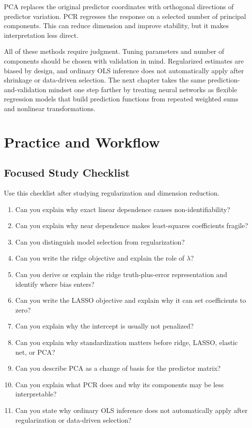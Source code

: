PCA replaces the original predictor coordinates with orthogonal directions of predictor variation.  PCR regresses the response on a selected number of principal components.  This can reduce dimension and improve stability, but it makes interpretation less direct.

All of these methods require judgment.  Tuning parameters and number of components should be chosen with validation in mind.  Regularized estimates are biased by design, and ordinary OLS inference does not automatically apply after shrinkage or data-driven selection.  The next chapter takes the same prediction-and-validation mindset one step farther by treating neural networks as flexible regression models that build prediction functions from repeated weighted sums and nonlinear transformations.

\section{Practice and Workflow}

\subsection*{Focused Study Checklist}

Use this checklist after studying regularization and dimension reduction.

\begin{enumerate}
  \item Can you explain why exact linear dependence causes non-identifiability?
  \item Can you explain why near dependence makes least-squares coefficients fragile?
  \item Can you distinguish model selection from regularization?
  \item Can you write the ridge objective and explain the role of \(\lambda\)?
  \item Can you derive or explain the ridge truth-plus-error representation and identify where bias enters?
  \item Can you write the LASSO objective and explain why it can set coefficients to zero?
  \item Can you explain why the intercept is usually not penalized?
  \item Can you explain why standardization matters before ridge, LASSO, elastic net, or PCA?
  \item Can you describe PCA as a change of basis for the predictor matrix?
  \item Can you explain what PCR does and why its components may be less interpretable?
  \item Can you state why ordinary OLS inference does not automatically apply after regularization or data-driven selection?
\end{enumerate}

